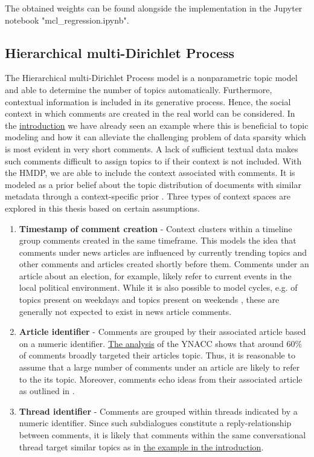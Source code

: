 The obtained weights can be found alongside the implementation in the Jupyter notebook "mcl\_regression.ipynb".

\subsection{Hierarchical multi-Dirichlet Process}
\label{hmdpapproach}
The Hierarchical multi-Dirichlet Process model \cite{DBLP:phd/dnb/Kling16} is a nonparametric topic model and able to determine the number of topics automatically. Furthermore, contextual information is included in its generative process. Hence, the social context in which comments are created in the real world can be considered. In the \hyperref[figcontext]{introduction} we have already seen an example where this is beneficial to topic modeling and how it can alleviate the challenging problem of data sparsity which is most evident in very short comments. A lack of sufficient textual data makes such comments difficult to assign topics to \cite{DBLP:conf/ecir/AkerKBPBHG16} if their context is not included. With the HMDP, we are able to include the context associated with comments. It is modeled as a prior belief about the topic distribution of documents with similar metadata through a context-specific prior \cite{DBLP:phd/dnb/Kling16}. Three types of context spaces are explored in this thesis based on certain assumptions.
\begin{enumerate}
\item \textbf{Timestamp of comment creation} - Context clusters within a timeline group comments created in the same timeframe. This models the idea that comments under news articles are influenced by currently trending topics and other comments and articles created shortly before them. Comments under an article about an election, for example, likely refer to current events in the local political environment. While it is also possible to model cycles, e.g. of topics present on weekdays and topics present on weekends \cite{DBLP:phd/dnb/Kling16}, these are generally not expected to exist in news article comments.
\item \textbf{Article identifier} - Comments are grouped by their associated article based on a numeric identifier. \hyperref[review]{The analysis} of the YNACC shows that around 60\% of comments broadly targeted their articles topic. Thus, it is reasonable to assume that a large number of comments under an article are likely to refer to the its topic. Moreover, comments echo ideas from their associated article as outlined in \cite{DBLP:conf/cikm/MaSYC12}.
\item \textbf{Thread identifier} - Comments are grouped within threads indicated by a numeric identifier. Since such subdialogues constitute a reply-relationship between comments, it is likely that comments within the same conversational thread target similar topics as in \hyperref[figcontext]{the example in the introduction}.
\end{enumerate}
